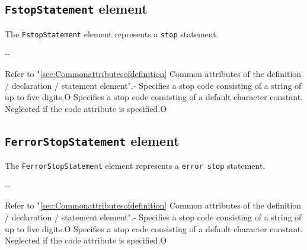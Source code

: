 \subsection{ {\tt FstopStatement} element}

The {\tt FstopStatement} element represents a {\tt stop} statement.


\begin{XcodeMLChildElements}
\XcodeMLElementDef{-}
{-}{-}
\end{XcodeMLChildElements}

\begin{XcodeMLAttributes}
{Refer to "\ref{sec:Commonattributesofdefinition} Common attributes of the definition / declaration / statement element".}{-}
{Specifies a stop code consisting of a string of up to five digits.}{O}
{Specifies a stop code consisting of a default character constant.
 Neglected if the code attribute is specified.}{O}
\end{XcodeMLAttributes}


\subsection{ {\tt FerrorStopStatement} element}

The {\tt FerrorStopStatement} element represents a {\tt error stop} statement.


\begin{XcodeMLChildElements}
\XcodeMLElementDef{-}
{-}{-}
\end{XcodeMLChildElements}

\begin{XcodeMLAttributes}
{Refer to "\ref{sec:Commonattributesofdefinition} Common attributes of the definition / declaration / statement element".}{-}
{Specifies a stop code consisting of a string of up to five digits.}{O}
{Specifies a stop code consisting of a default character constant.
 Neglected if the code attribute is specified.}{O}
\end{XcodeMLAttributes}


